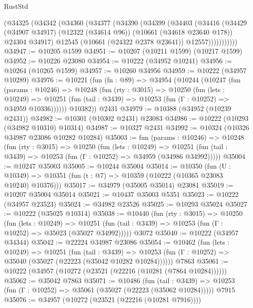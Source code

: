 \begin{lexlean}{RustStd}
\begin{coremodule}
          (@34325
            (@34342
              (@34360
                (@34377
                  (@34390
                    (@34399
                      (@34403
                        (@34416
                          (@34429
                            (@34907 @34917)
                            (@12322 (@34614 @96))
                            (@10661 (@34618 @23640 @178))
                            @24304
                            @34917)
                          @12545
                          (@10661 (@24322 @2378 @23641))
                          @12557)))))))))))
@34947 := @10205 @1599
@34951 := @10207 (@10211 @1599) (@10217 @1599)
@34952 := @10226 @23080
@34954 := @10222 (@34952 @10241)
@34956 := @10264 (@10265 @1599)
@34957 := @10260 @34956
@34959 := @10222 (@34957 @10289)
@34976 := @10221
    (fun (fn : @89) =>
    @34954
      (@10244
        (@10247
          (fun (params : @10246) =>
          @10248
            (fun (rty : @3015) =>
            @10250
              (fun (lets : @10249) =>
              @10251 (fun (tail : @3439) => @10253 (fun (Γ : @10252) => @34959 @10336))))))
        @10382))
    @2431
@34979 := @10388 (@34952 (@10239 @2431))
@34982 := @10301 (@10302 @2431) @23083
@34986 := @10222 (@10293 (@34982 @10310) @10314)
@34987 := @10327 @2431
@34992 := @10324 (@10326 @34987 @23086 @10282 @10284)
@35003 := fun (params : @10246) =>
  @10248
    (fun (rty : @3015) =>
    @10250
      (fun (lets : @10249) =>
      @10251 (fun (tail : @3439) => @10253 (fun (Γ : @10252) => @34959 (@34986 @34992)))))
@35004 := @10247 @35003
@35005 := @10244 @35004
@35014 := @10350
    (fun (U : @10349) => @10351 (fun (t : @7) => @10359 (@10222 (@10365 @23083 @10240) @10376)))
@35017 := @34979 (@35005 @35014) @23081
@35019 := @10207 @35004 @35014
@35021 := @10437 @35003 @5351
@35023 := @10222 (@34957 @23523)
@35024 := @34982 @23526
@35025 := @10293 @35024
@35027 := @10222 (@35025 @10314)
@35038 := @10440
    (fun (rty : @3015) =>
    @10250
      (fun (lets : @10249) =>
      @10251 (fun (tail : @3439) => @10253 (fun (Γ : @10252) => @35023 (@35027 @34992)))))
    @3072
@35040 := @10222 (@34957 @34344)
@35042 := @22224 @34987 @23086
@35054 := @10462
    (fun (lets : @10249) =>
    @10251
      (fun (tail : @3439) =>
      @10253 (fun (Γ : @10252) => @35040 (@35027 (@22223 (@35042 @10282 @10284))))))
    @7863
@35061 := @10222 (@34957 (@10272 (@23521 (@22216 (@10281 (@7864 @10284))))))
@35062 := @35042 @7863
@35071 := @10486
    (fun (tail : @3439) => @10253 (fun (Γ : @10252) => @35061 (@35027 (@22223 (@35062 @10284)))))
    @7915
@35076 := @34957 (@10272 (@23521 (@22216 (@10281 @7916))))

\end{coremodule}
\end{lexlean}

